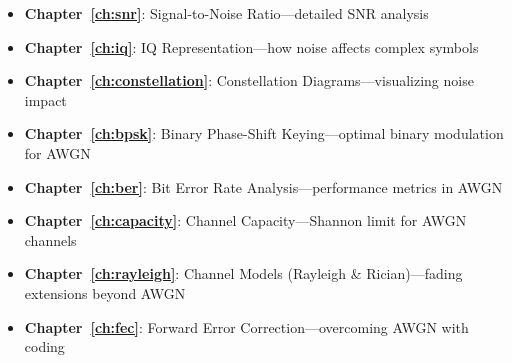 \begin{itemize}
\item \textbf{Chapter~\ref{ch:snr}}: Signal-to-Noise Ratio---detailed SNR analysis
\item \textbf{Chapter~\ref{ch:iq}}: IQ Representation---how noise affects complex symbols
\item \textbf{Chapter~\ref{ch:constellation}}: Constellation Diagrams---visualizing noise impact
\item \textbf{Chapter~\ref{ch:bpsk}}: Binary Phase-Shift Keying---optimal binary modulation for AWGN
\item \textbf{Chapter~\ref{ch:ber}}: Bit Error Rate Analysis---performance metrics in AWGN
\item \textbf{Chapter~\ref{ch:capacity}}: Channel Capacity---Shannon limit for AWGN channels
\item \textbf{Chapter~\ref{ch:rayleigh}}: Channel Models (Rayleigh \& Rician)---fading extensions beyond AWGN
\item \textbf{Chapter~\ref{ch:fec}}: Forward Error Correction---overcoming AWGN with coding
\end{itemize}
